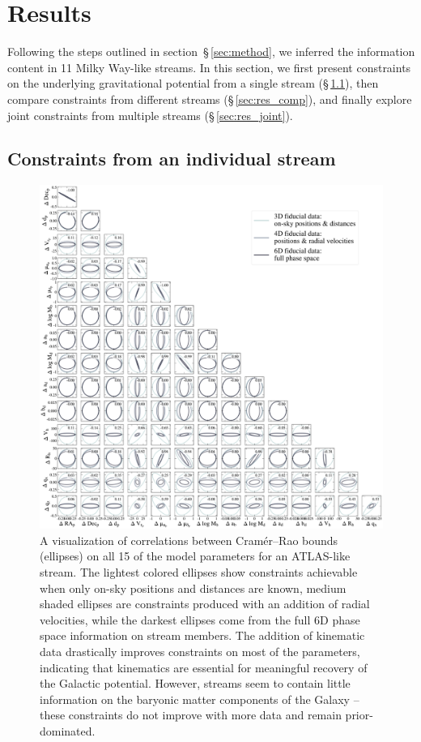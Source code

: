 \documentclass[modern]{aastex62}
\begin{document}
\section{Results}
\label{sec:results}
Following the steps outlined in section~\S\,\ref{sec:method}, we inferred the information content in 11 Milky Way-like streams.
In this section, we first present constraints on the underlying gravitational potential from a single stream (\S\,\ref{sec:res_ind}), then compare constraints from different streams (\S\,\ref{sec:res_comp}), and finally explore joint constraints from multiple streams (\S\,\ref{sec:res_joint}).

\subsection{Constraints from an individual stream}
\label{sec:res_ind}

\begin{figure}
\begin{center}
\includegraphics[width=\textwidth]{crb_correlations.pdf}
\caption{A visualization of correlations between Cram\'er--Rao bounds (ellipses) on all 15 of the model parameters for an ATLAS-like stream.
The lightest colored ellipses show constraints achievable when only on-sky positions and distances are known, medium shaded ellipses are constraints produced with an addition of radial velocities, while the darkest ellipses come from the full 6D phase space information on stream members.
The addition of kinematic data drastically improves constraints on most of the parameters, indicating that kinematics are essential for meaningful recovery of the Galactic potential.
However, streams seem to contain little information on the baryonic matter components of the Galaxy -- these constraints do not improve with more data and remain prior-dominated.
}
\label{fig:crb_correlations}
\end{center}
\end{figure}
\end{document}
